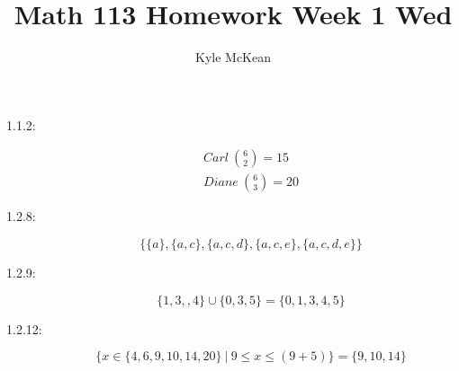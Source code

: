 \documentclass[11pt]{article}
\author{Kyle McKean}
\title{Math 113 Homework Week 1 Wed}
\begin{document}
\maketitle
\begin{description}
  \item[1.1.2:]
    \begin{equation*}
      \begin{split}
        Carl \ {6 \choose 2} = 15 \\
        Diane \ {6 \choose 3} = 20
      \end{split}
    \end{equation*}
  \item[1.2.8:]
    \begin{equation}
      \{ \{ a \}, \{ a, c \}, \{ a, c, d \}, \{ a, c, e \}, \{ a, c, d, e \} \}
    \end{equation}
  \item[1.2.9:]
    \begin{equation}
      \{ 1, 3, ,4\} \cup \{ 0, 3, 5\} = \{ 0, 1, 3, 4, 5 \}
    \end{equation}
  \item[1.2.12:]
    \begin{equation}
      \{ x \in \{ 4, 6, 9, 10, 14, 20 \} \ \vert \  9 \le x \le (9 + 5) \}
      =
      \{ 9, 10, 14 \}
    \end{equation}
\end{description} 
\end{document}
